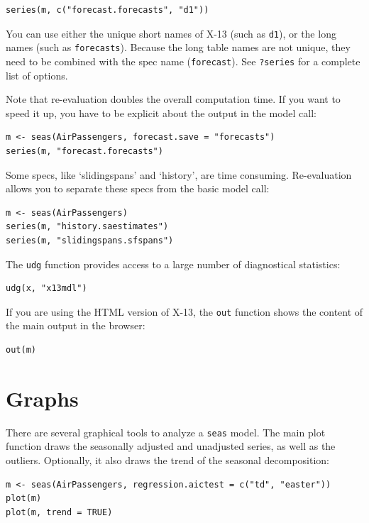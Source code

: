\begin{verbatim}
series(m, c("forecast.forecasts", "d1"))
\end{verbatim}

You can use either the unique short names of X-13 (such as \texttt{d1}),
or the long names (such as \texttt{forecasts}). Because the long table
names are not unique, they need to be combined with the spec name
(\texttt{forecast}). See \texttt{?series} for a complete list of
options.

Note that re-evaluation doubles the overall computation time. If you
want to speed it up, you have to be explicit about the output in the
model call:

\begin{verbatim}
m <- seas(AirPassengers, forecast.save = "forecasts")
series(m, "forecast.forecasts")
\end{verbatim}

Some specs, like `slidingspans' and `history', are time consuming.
Re-evaluation allows you to separate these specs from the basic model
call:

\begin{verbatim}
m <- seas(AirPassengers)
series(m, "history.saestimates")
series(m, "slidingspans.sfspans")
\end{verbatim}

The \texttt{udg} function provides access to a large number of
diagnostical statistics:

\begin{verbatim}
udg(x, "x13mdl")
\end{verbatim}

If you are using the HTML version of X-13, the \texttt{out} function
shows the content of the main output in the browser:

\begin{verbatim}
out(m)
\end{verbatim}

\section{Graphs}\label{graphs}

There are several graphical tools to analyze a \texttt{seas} model. The
main plot function draws the seasonally adjusted and unadjusted series,
as well as the outliers. Optionally, it also draws the trend of the
seasonal decomposition:

\begin{verbatim}
m <- seas(AirPassengers, regression.aictest = c("td", "easter"))
plot(m)
plot(m, trend = TRUE)
\end{verbatim}

